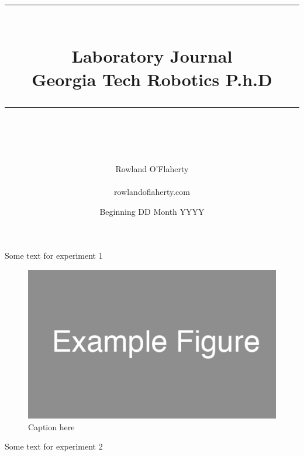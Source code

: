 \documentclass[idxtotoc,hyperref,openany,oneside]{labbook} %
\newcommand{\HRule}{\rule{\linewidth}{0.5mm}} %
\begin{document}

\frontmatter %
\title{
\begin{center}
\HRule \\[0.4cm]
{\Huge \bfseries Laboratory Journal \\[0.5cm] \Large Georgia Tech Robotics P.h.D}\\[0.4cm] %
\HRule \\[1.5cm]
\end{center}
}
\author{\Huge Rowland O'Flaherty \\ \\ \LARGE rowlandoflaherty.com \\[2cm]}
\date{Beginning DD Month YYYY} %
\maketitle

\tableofcontents

\mainmatter %





Some text for experiment 1

\begin{figure}[H]
  \centering
  \includegraphics[]{Figs_2000_12_30/example_figure.png}
  \caption{Caption here}
  \label{fig:1}
\end{figure}



Some text for experiment 2


\end{document}
